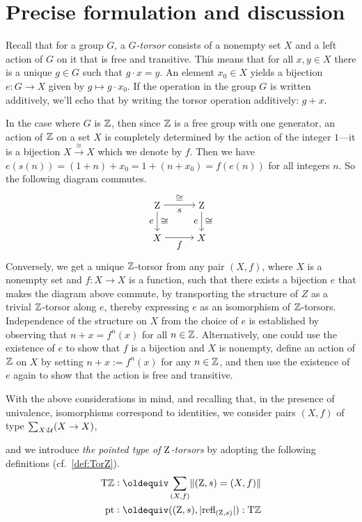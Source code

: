 \documentclass[a4paper,12pt]{amsart}
\begin{document}
\section{Precise formulation and discussion}\label{sec:statement}

{Recall that for a group $G$, a {\em $G$-torsor} consists of a nonempty set $X$ and
  a left action of $G$ on it that is free and transitive.  This means that for all $x,y \in X$ there is a unique $g \in G$ such
  that $g \cdot x = y$.  An element $x_0 \in X$ yields a bijection $e: G \to X$ given by $g \mapsto g \cdot x_0$.
  If the operation in the group $G$ is written additively, we'll echo that by writing the torsor operation additively: $g + x$.

In the case where $G$ is $\mathbb{Z}$, then since $\mathbb{Z}$ is a free group with one generator, an action of $\mathbb{Z}$ on a set $X$ is completely
determined by the action of the integer $1$---it is a bijection $X \xrightarrow{\cong} X$ which we denote by $f$.
Then we have $e(s(n)) = (1+n) + x_0 = 1 + (n + x_0) = f(e(n))$ for all
integers $n$.  So the following diagram commutes.
\[
\begin{tikzpicture} %
   \matrix (m)
   [matrix of math nodes, row sep=2em, column sep=3em, ampersand replacement=\&]
    {\zet \& \zet \\ X \& X \\ };
\draw[->] (m-1-1) -- (m-1-2) node[midway,below] {$s$} node[midway,above] {$\cong$};
\draw[->] (m-1-1) -- (m-2-1) node[midway,left] {$e$} node[midway,right] {$\cong$};
\draw[->] (m-1-2) -- (m-2-2) node[midway,left] {$e$} node[midway,right] {$\cong$};
\draw[->] (m-2-1) -- (m-2-2) node[midway,below] {$f$} ;
\end{tikzpicture}
\]
Conversely, we get a unique $\mathbb{Z}$-torsor from any pair $(X,f)$, where $X$ is a nonempty set and $f : X \to X$ is a function, such that there
exists a bijection $e$ that makes the diagram above commute, by transporting the structure of $Z$ as a trivial $\mathbb{Z}$-torsor along $e$, thereby
expressing $e$ as an isomorphism of $\mathbb{Z}$-torsors.  Independence of the structure on $X$ from the choice of $e$ is established by observing that
$n + x = f^n(x)$ for all $n \in \mathbb{Z}$.  Alternatively, one could use the existence of $e$ to show that $f$ is a bijection and $X$ is nonempty,
define an action of $\mathbb{Z}$ on $X$ by setting $n + x := f^n(x)$ for any $n \in \mathbb{Z}$, and then use the existence of $e$ again to show that the
action is free and transitive.

With the above considerations in mind, and recalling that, in the presence of univalence, isomorphisms correspond to identities,
we consider pairs $(X,f)$ of type $\sum_{X:\mathcal{U}}(X\to X)$,}
and we introduce \emph{the pointed type of $\mathrm{Z}$-torsors} by adopting the following definitions
(cf.~\cref{def:TorZ}).
\begin{align*}
  \TorZ &\defeq \sum_{(X,f)}\Trunc{(\zet,s)=(X,f)}  \\
  \pt & \defeq ((\zet,s),\trunc{\refl{(\zet,s)}}) : \TorZ
\end{align*}
\end{document}

